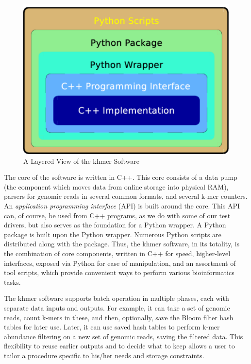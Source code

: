 \documentclass{article}
\begin{document}
\begin{figure}[ht!]
\centering
\includegraphics[scale=0.6]{layers.pdf}
\caption{A Layered View of the khmer Software}
\label{khmerLayers}
\end{figure}

The core of the software is written in C++. This core consists of a data pump (the
component which moves data from online storage into physical RAM), parsers for
genomic reads in several common formats, and several k-mer counters. An
\textit{application programming interface} (API) is built around the core. This
API can, of course, be used from C++ programs, as we do with some of our test
drivers, but also serves as the foundation for a Python wrapper. A Python
package is built upon the Python wrapper. Numerous Python scripts are
distributed along with the package. Thus, the khmer software, in its totality,
is the combination of core components, written in C++ for speed, higher-level
interfaces, exposed via Python for ease of manipulation, and an assortment of
tool scripts, which provide convenient ways to perform various bioinformatics
tasks.

The khmer software supports batch operation in multiple phases, each with
separate data inputs and outputs. For example, it can take a set of genomic
reads, count k-mers in these, and then, optionally, save the Bloom filter hash
tables for later use. Later, it can use saved hash tables to perform k-mer
abundance filtering on a new set of genomic reads, saving the filtered data.
This flexibility to reuse earlier outputs and to decide what to keep allows a
user to tailor a procedure specific to his/her needs and storage constraints.
\end{document}
